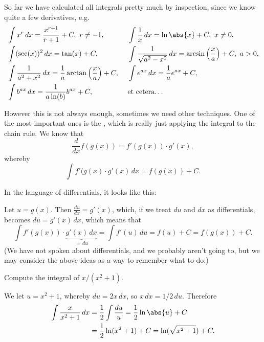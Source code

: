

So far we have calculated all integrals pretty much by inspection, since we know quite a few derivatives, e.g.
\begin{alignat*}{2}
	  & \int x^r \, d x = \frac{x^{r + 1}}{r + 1} + C, ~r \neq -1, ~                          &   & \int \frac{1}{x} \, d x = \ln\abs{x} + C, ~x \neq 0,                                   \\
	  & \int (\sec(x))^2 \, d x = \tan(x) + C, ~                                              &   & \int \frac{1}{\sqrt{a^2 - x^2}} \, d x = \arcsin\Big ( \frac{x}{a} \Big ) + C, ~a > 0, \\
	  & \int \frac{1}{a^2 + x^2} \, d x = \frac{1}{a} \arctan\Big ( \frac{x}{a} \Big ) + C, ~ &   & \int e^{a x} \, d x = \frac{1}{a} e^{a x} + C,                                         \\
	  & \int b^{a x} \, d x = \frac{1}{a \ln(b)} b^{a x} + C, ~                               &   & \text{et cetera\ldots}
\end{alignat*}

\noindent
However this is not always enough, sometimes we need other techniques.
One of the most important ones is the , which is really just applying the integral to the chain rule.
We know that
\[
	\frac{d}{d x} f(g(x)) = f'(g(x)) \cdot g'(x),
\]
whereby
\[
	\int f'(g(x) \cdot g'(x) \, d x = f(g(x)) + C.
\]

\noindent
In the language of differentials, it looks like this:

Let $u = g(x)$.
Then $\frac{d u}{d x} = g'(x)$, which, if we treat $d u$ and $d x$ as differentials, becomes $d u = g'(x) \, d x$, which means that
\[
	\int f'(g(x)) \cdot \underbrace{g'(x) \, d x}_{=\, d u} = \int f'(u) \, d u = f(u) + C = f(g(x)) + C.
\]
(We have not spoken about differentials, and we probably aren't going to, but we may consider the above ideas as a way to remember what to do.)

\begin{example}
	Compute the integral of $x / (x^2 + 1)$.

	We let $u = x^2 + 1$, whereby $d u = 2 x \, d x$, so $x \, d x = 1/2 \, d u$.
	Therefore
	\begin{align*}
		\int \frac{x}{x^2 + 1} \, d x & = \frac{1}{2} \int \frac{d u}{u} = \frac{1}{2} \ln\abs{u} + C \\
		                              & = \frac{1}{2} \ln(x^2 + 1) + C = \ln(\sqrt{x^2 + 1}) + C.
	\end{align*}
\end{example}

